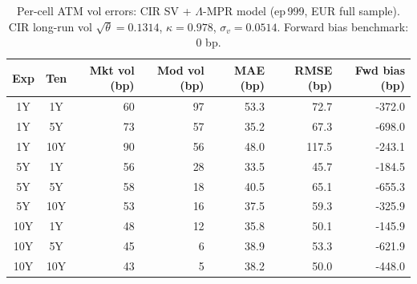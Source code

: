 \begin{table}[H]
\centering
\caption{Per-cell ATM vol errors: CIR SV + $\Lambda$-MPR model (ep\,999, EUR full sample). CIR long-run vol $\sqrt{\theta}=0.1314$, $\kappa=0.978$, $\sigma_v=0.0514$. Forward bias benchmark: 0 bp.}
\label{tab:sv_lambda_per_cell_final}
\small
\begin{tabular}{@{}ccrrrrr@{}}
\toprule
\textbf{Exp} & \textbf{Ten} & \textbf{Mkt vol (bp)} & \textbf{Mod vol (bp)} & \textbf{MAE (bp)} & \textbf{RMSE (bp)} & \textbf{Fwd bias (bp)} \\
\midrule
  1Y & 1Y & 60 & 97 & 53.3 & 72.7 & -372.0 \\
  1Y & 5Y & 73 & 57 & 35.2 & 67.3 & -698.0 \\
  1Y & 10Y & 90 & 56 & 48.0 & 117.5 & -243.1 \\
  \midrule
  5Y & 1Y & 56 & 28 & 33.5 & 45.7 & -184.5 \\
  5Y & 5Y & 58 & 18 & 40.5 & 65.1 & -655.3 \\
  5Y & 10Y & 53 & 16 & 37.5 & 59.3 & -325.9 \\
  \midrule
  10Y & 1Y & 48 & 12 & 35.8 & 50.1 & -145.9 \\
  10Y & 5Y & 45 & 6 & 38.9 & 53.3 & -621.9 \\
  10Y & 10Y & 43 & 5 & 38.2 & 50.0 & -448.0 \\
\bottomrule
\end{tabular}
\end{table}